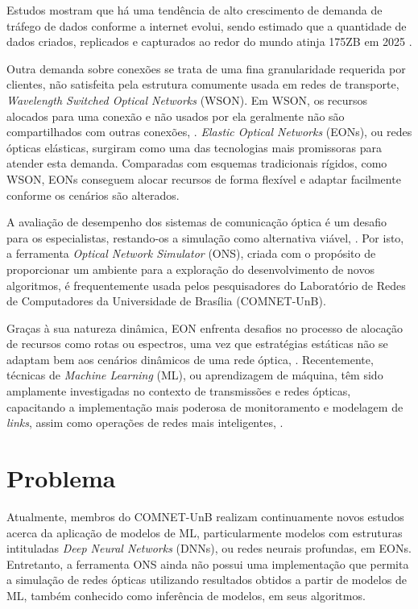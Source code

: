 

Estudos mostram que há uma tendência de alto crescimento de demanda de tráfego de dados conforme a internet evolui, sendo estimado que a quantidade de dados criados, replicados e capturados ao redor do mundo atinja 175ZB em 2025 \cite{reinsel_gantz_rydning_2018}.

Outra demanda sobre conexões se trata de uma fina granularidade requerida por clientes, não satisfeita pela estrutura comumente usada em redes de transporte, \textit{Wavelength Switched Optical Networks} (WSON). Em WSON, os recursos alocados para uma conexão e não usados por ela geralmente não são compartilhados com outras conexões, \cite{dantaschallenges2014}. \textit{Elastic Optical Networks} (EONs), ou redes ópticas elásticas, surgiram como uma das tecnologias mais promissoras para atender esta demanda. Comparadas com esquemas tradicionais rígidos, como WSON, EONs conseguem alocar recursos de forma flexível e adaptar facilmente conforme os cenários são alterados. \cite{deeplearning4j}

A avaliação de desempenho dos sistemas de comunicação óptica é um desafio para os especialistas, restando-os a simulação como alternativa viável, \cite{costa2016ons}. Por isto, a ferramenta \textit{Optical Network Simulator} (ONS), criada com o propósito de proporcionar um ambiente para a exploração do desenvolvimento de novos algoritmos, é frequentemente usada pelos pesquisadores do Laboratório de Redes de Computadores da Universidade de Brasília (COMNET-UnB).

Graças à sua natureza dinâmica, EON enfrenta desafios no processo de alocação de recursos como rotas ou espectros, uma vez que estratégias estáticas não se adaptam bem aos cenários dinâmicos de uma rede óptica,  \cite{deep_quality_rsa}. Recentemente, técnicas de \textit{Machine Learning} (ML), ou aprendizagem de máquina, têm sido amplamente investigadas no contexto de transmissões e redes ópticas, capacitando a implementação mais poderosa de monitoramento e modelagem de \textit{links}, assim como operações de redes mais inteligentes, \cite{eon_ml_application}.

\section{Problema}
\label{intro-problem}

Atualmente, membros do COMNET-UnB realizam continuamente novos estudos acerca da aplicação de modelos de ML, particularmente modelos com estruturas intituladas \textit{Deep Neural Networks} (DNNs), ou redes neurais profundas, em EONs. Entretanto, a ferramenta ONS ainda não possui uma implementação que permita a simulação de redes ópticas utilizando resultados obtidos a partir de modelos de ML, também conhecido como inferência de modelos, em seus algoritmos.

